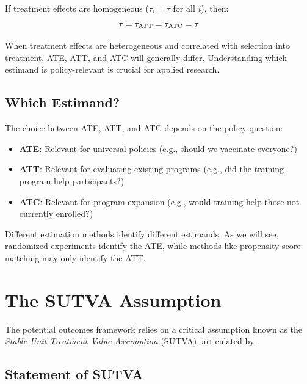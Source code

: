 \begin{corollary}
If treatment effects are homogeneous ($\tau_i = \tau$ for all $i$), then:
\begin{equation}
\tau = \tau_{\text{ATT}} = \tau_{\text{ATC}} = \tau
\end{equation}
\end{corollary}

When treatment effects are heterogeneous and correlated with selection into treatment, ATE, ATT, and ATC will generally differ. Understanding which estimand is policy-relevant is crucial for applied research.

\subsection{Which Estimand?}

The choice between ATE, ATT, and ATC depends on the policy question:

\begin{itemize}
    \item \textbf{ATE}: Relevant for universal policies (e.g., should we vaccinate everyone?)
    \item \textbf{ATT}: Relevant for evaluating existing programs (e.g., did the training program help participants?)
    \item \textbf{ATC}: Relevant for program expansion (e.g., would training help those not currently enrolled?)
\end{itemize}

Different estimation methods identify different estimands. As we will see, randomized experiments identify the ATE, while methods like propensity score matching may only identify the ATT.


\section{The SUTVA Assumption}
\label{sec:sutva}

The potential outcomes framework relies on a critical assumption known as the \emph{Stable Unit Treatment Value Assumption} (SUTVA), articulated by \cite{rubin1980comment}.

\subsection{Statement of SUTVA}

